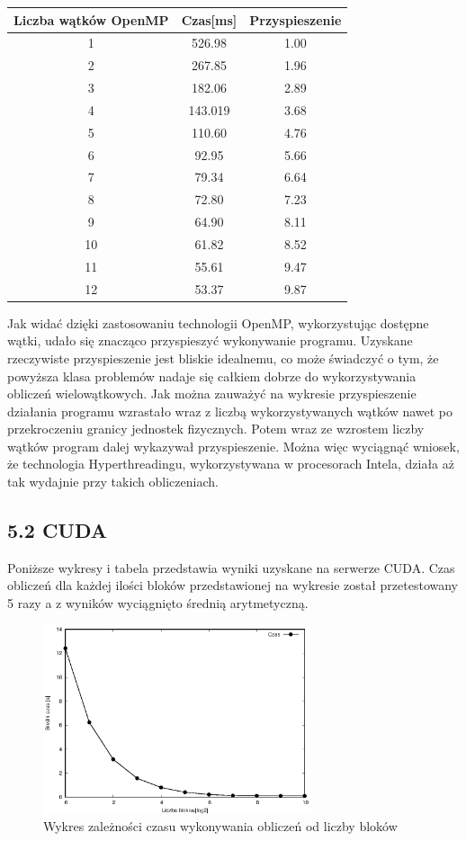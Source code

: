 \documentclass[a4paper,12pt]{article}
\begin{document}
\newpage
\begin{table}[htb]
\centering
\begin{tabular}{|c|c|c|}\hline
Liczba wątków OpenMP & Czas[ms] & Przyspieszenie\\ \hline 
1 & 526.98 & 1.00\\ \hline 
2 & 267.85 & 1.96\\ \hline 
3 & 182.06 & 2.89\\ \hline 
4 & 143.019 & 3.68\\ \hline 
5 & 110.60 & 4.76\\ \hline 
6 & 92.95 & 5.66\\ \hline 
7 & 79.34 & 6.64\\ \hline 
8 & 72.80 & 7.23\\ \hline
9 & 64.90 & 8.11\\ \hline 
10 & 61.82 & 8.52\\ \hline 
11 & 55.61 & 9.47\\ \hline 
12 & 53.37 & 9.87\\ \hline
\end{tabular}
\end{table}

Jak widać dzięki zastosowaniu technologii OpenMP, wykorzystując dostępne wątki, udało się znacząco przyspieszyć wykonywanie programu. Uzyskane rzeczywiste przyspieszenie jest bliskie idealnemu, co może świadczyć o tym, że powyższa klasa problemów nadaje się całkiem dobrze do wykorzystywania obliczeń wielowątkowych.
Jak można zauważyć na wykresie przyspieszenie działania programu wzrastało wraz z liczbą wykorzystywanych wątków nawet po przekroczeniu granicy jednostek fizycznych. Potem wraz ze wzrostem liczby wątków program dalej wykazywał przyspieszenie. Można więc wyciągnąć wniosek, że technologia Hyperthreadingu, wykorzystywana w procesorach Intela, działa aż tak wydajnie przy takich obliczeniach.
\newpage

\subsection*{5.2 CUDA}
Poniższe wykresy i tabela przedstawia wyniki uzyskane na serwerze CUDA. Czas obliczeń dla każdej ilości bloków przedstawionej na wykresie został przetestowany 5 razy a z wyników wyciągnięto średnią arytmetyczną.


\begin{figure}[!ht]
	\centering
  \includegraphics[width=0.7\textwidth]{cudaWykresCzas.eps}
  \caption{Wykres zależności czasu wykonywania obliczeń od liczby bloków}
\end{figure}
\end{document}
